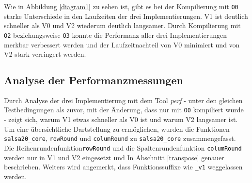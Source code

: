 \documentclass[course=erap]{aspdoc}
\begin{document}
\begin{center}
\label{diagram1}
\end{center}
Wie in Abbildung \ref{diagram1} zu sehen ist, gibt es bei der Kompilierung mit \texttt{O0} starke
Unterschiede in den Laufzeiten der drei Implementierungen. V1 ist deutlich schneller als V0 
und V2 wiederum deutlich langsamer. Durch Kompilierung mit \texttt{O2} beziehungsweise \texttt{O3}
konnte die Performanz aller drei Implementierungen merkbar verbessert werden und der Laufzeitnachteil
von V0 minimiert und von V2 stark verringert werden.

\subsection{Analyse der Performanzmessungen}
Durch Analyse der drei Implementierung mit dem Tool \emph{perf} - unter 
den gleichen Testbedingungen als zuvor, mit der Änderung, dass nur mit \texttt{O0} kompiliert wurde 
- zeigt sich, warum V1 etwas schneller als V0 ist und warum V2 langsamer ist.
Um eine übersichtliche Dartstellung zu ermöglichen, wurden die Funktionen \texttt{salsa20\_core},
\texttt{rowRound} und \texttt{columRound} zu \texttt{salsa20\_core} zusammengefasst. 
Die Reihenrundenfunktion\texttt{rowRound} und die Spaltenrundenfunktion \texttt{columRound} werden 
nur in V1 und V2 eingesetzt und In Abschnitt \ref{transpose} genauer beschrieben.
Weiters wird angemerkt, dass Funktionssuffixe wie \texttt{\_v1} weggelassen werden.
\end{document}
